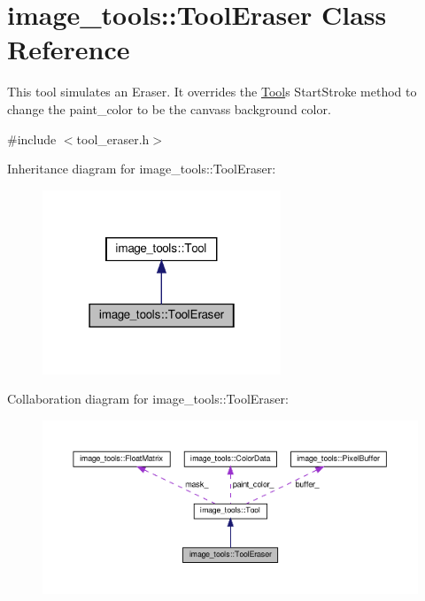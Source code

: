 \hypertarget{classimage__tools_1_1ToolEraser}{}\section{image\+\_\+tools\+:\+:Tool\+Eraser Class Reference}
\label{classimage__tools_1_1ToolEraser}


This tool simulates an Eraser. It overrides the \hyperlink{classimage__tools_1_1Tool}{Tool}\textquotesingle{}s Start\+Stroke method to change the paint\+\_\+color to be the canvas\textquotesingle{}s background color.  




{\ttfamily \#include $<$tool\+\_\+eraser.\+h$>$}



Inheritance diagram for image\+\_\+tools\+:\+:Tool\+Eraser\+:
\nopagebreak
\begin{figure}[H]
\begin{center}
\leavevmode
\includegraphics[width=202pt]{classimage__tools_1_1ToolEraser__inherit__graph}
\end{center}
\end{figure}


Collaboration diagram for image\+\_\+tools\+:\+:Tool\+Eraser\+:
\nopagebreak
\begin{figure}[H]
\begin{center}
\leavevmode
\includegraphics[width=350pt]{classimage__tools_1_1ToolEraser__coll__graph}
\end{center}
\end{figure}
